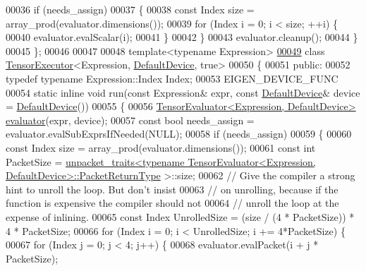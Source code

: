 \begin{DoxyCode}
00036     \textcolor{keywordflow}{if} (needs\_assign)
00037     \{
00038       \textcolor{keyword}{const} Index size = array\_prod(evaluator.dimensions());
00039       \textcolor{keywordflow}{for} (Index i = 0; i < size; ++i) \{
00040         evaluator.evalScalar(i);
00041       \}
00042     \}
00043     evaluator.cleanup();
00044   \}
00045 \};
00046 
00047 
00048 \textcolor{keyword}{template}<\textcolor{keyword}{typename} Expression>
\hyperlink{class_eigen_1_1internal_1_1_tensor_executor_3_01_expression_00_01_default_device_00_01true_01_4}{00049} \textcolor{keyword}{class }\hyperlink{class_eigen_1_1internal_1_1_tensor_executor}{TensorExecutor}<Expression, \hyperlink{struct_eigen_1_1_default_device}{DefaultDevice}, true>
00050 \{
00051  \textcolor{keyword}{public}:
00052   \textcolor{keyword}{typedef} \textcolor{keyword}{typename} Expression::Index Index;
00053   EIGEN\_DEVICE\_FUNC
00054   \textcolor{keyword}{static} \textcolor{keyword}{inline} \textcolor{keywordtype}{void} run(\textcolor{keyword}{const} Expression& expr, \textcolor{keyword}{const} \hyperlink{struct_eigen_1_1_default_device}{DefaultDevice}& device = 
      \hyperlink{struct_eigen_1_1_default_device}{DefaultDevice}())
00055   \{
00056     \hyperlink{struct_eigen_1_1_tensor_evaluator}{TensorEvaluator<Expression, DefaultDevice>} 
      \hyperlink{struct_eigen_1_1internal_1_1evaluator}{evaluator}(expr, device);
00057     \textcolor{keyword}{const} \textcolor{keywordtype}{bool} needs\_assign = evaluator.evalSubExprsIfNeeded(NULL);
00058     \textcolor{keywordflow}{if} (needs\_assign)
00059     \{
00060       \textcolor{keyword}{const} Index size = array\_prod(evaluator.dimensions());
00061       \textcolor{keyword}{const} \textcolor{keywordtype}{int} PacketSize = 
      \hyperlink{struct_eigen_1_1internal_1_1unpacket__traits}{unpacket\_traits<typename TensorEvaluator<Expression, DefaultDevice>::PacketReturnType}
      >::size;
00062       \textcolor{comment}{// Give the compiler a strong hint to unroll the loop. But don't insist}
00063       \textcolor{comment}{// on unrolling, because if the function is expensive the compiler should not}
00064       \textcolor{comment}{// unroll the loop at the expense of inlining.}
00065       \textcolor{keyword}{const} Index UnrolledSize = (size / (4 * PacketSize)) * 4 * PacketSize;
00066       \textcolor{keywordflow}{for} (Index i = 0; i < UnrolledSize; i += 4*PacketSize) \{
00067         \textcolor{keywordflow}{for} (Index j = 0; j < 4; j++) \{
00068           evaluator.evalPacket(i + j * PacketSize);

\end{DoxyCode}
